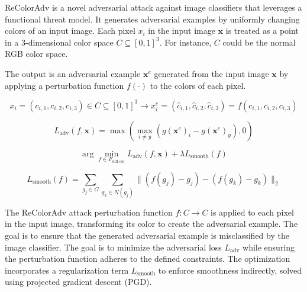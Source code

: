 ReColorAdv is a novel adversarial attack against image classifiers that leverages a functional threat model. It generates adversarial examples by uniformly changing colors of an input image. Each pixel $x_i$ in the input image $\mathbf{x}$ is treated as a point in a 3-dimensional color space $C \subseteq [0, 1]^3$. For instance, $C$ could be the normal RGB color space. 

The output is an adversarial example $\mathbf{x}^e$ generated from the input image $\mathbf{x}$ by applying a perturbation function $f(\cdot)$ to the colors of each pixel.

\begin{equation}
x_i = (c_{i,1}, c_{i,2}, c_{i,3}) \in C \subseteq [0, 1]^3 \rightarrow x_i^e = (\hat{c}_{i,1}, \hat{c}_{i,2}, \hat{c}_{i,3}) = f(c_{i,1}, c_{i,2}, c_{i,3})
\end{equation}

\begin{equation}
L_{\text{adv}}(f, \mathbf{x}) = \max \left( \max_{i \neq y} (g(\mathbf{x}^e)_i - g(\mathbf{x}^e)_y), 0 \right)
\end{equation}

\begin{equation}
\arg\min_{f \in F_{\text{diff-col}}} L_{\text{adv}}(f, \mathbf{x}) + \lambda L_{\text{smooth}}(f)
\end{equation}

\begin{equation}
L_{\text{smooth}}(f) = \sum_{g_j \in G} \sum_{g_k \in N(g_j)} \| (f(g_j) - g_j) - (f(g_k) - g_k) \|_2
\end{equation}

The ReColorAdv attack perturbation function $f: C \rightarrow C$ is applied to each pixel in the input image, transforming its color to create the adversarial example. The goal is to ensure that the generated adversarial example is misclassified by the image classifier. The goal is to minimize the adversarial loss $L_{\text{adv}}$ while ensuring the perturbation function adheres to the defined constraints. The optimization incorporates a regularization term $L_{\text{smooth}}$ to enforce smoothness indirectly, solved using projected gradient descent (PGD).

